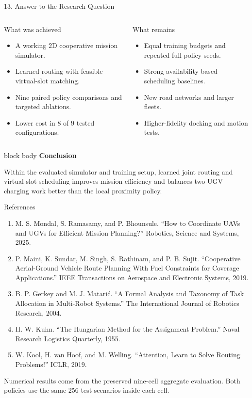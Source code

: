 \documentclass[aspectratio=169,10pt]{beamer}
\newcommand{\resultbox}[2]{%
\begin{beamercolorbox}[rounded=true,sep=1.5mm,wd=\linewidth]{block body}%
{\color{WarmCoral}\bfseries #1}\par{\small #2}
\end{beamercolorbox}}
\begin{document}
\begin{frame}{13. Answer to the Research Question}
\begin{columns}[T,onlytextwidth]
\begin{block}{What was achieved}
\begin{itemize}
\item A working 2D cooperative mission simulator.
\item Learned routing with feasible virtual-slot matching.
\item Nine paired policy comparisons and targeted ablations.
\item Lower cost in 8 of 9 tested configurations.
\end{itemize}
\end{block}
\begin{block}{What remains}
\begin{itemize}
\item Equal training budgets and repeated full-policy seeds.
\item Strong availability-based scheduling baselines.
\item New road networks and larger fleets.
\item Higher-fidelity docking and motion tests.
\end{itemize}
\end{block}
\end{columns}
\vspace{4mm}
\resultbox{Conclusion}{Within the evaluated simulator and training setup, learned joint routing and virtual-slot scheduling improves mission efficiency and balances two-UGV charging work better than the local proximity policy.}
\end{frame}

\begin{frame}{References}
\small
\begin{enumerate}
\item M. S. Mondal, S. Ramasamy, and P. Bhounsule. ``How to Coordinate UAVs and UGVs for Efficient Mission Planning?'' Robotics, Science and Systems, 2025.
\item P. Maini, K. Sundar, M. Singh, S. Rathinam, and P. B. Sujit. ``Cooperative Aerial-Ground Vehicle Route Planning With Fuel Constraints for Coverage Applications.'' IEEE Transactions on Aerospace and Electronic Systems, 2019.
\item B. P. Gerkey and M. J. Matari\'c. ``A Formal Analysis and Taxonomy of Task Allocation in Multi-Robot Systems.'' The International Journal of Robotics Research, 2004.
\item H. W. Kuhn. ``The Hungarian Method for the Assignment Problem.'' Naval Research Logistics Quarterly, 1955.
\item W. Kool, H. van Hoof, and M. Welling. ``Attention, Learn to Solve Routing Problems!'' ICLR, 2019.
\end{enumerate}
\vfill
{\color{Slate}\scriptsize Numerical results come from the preserved nine-cell aggregate evaluation. Both policies use the same 256 test scenarios inside each cell.}
\end{frame}
\end{document}
